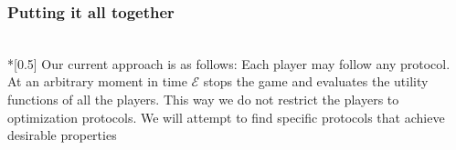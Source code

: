 \subsubsection{Putting it all together} \ \\*[0.5\baselineskip]
  Our current approach is as follows: Each player may follow any protocol. At an arbitrary
  moment in time $\mathcal{E}$ stops the game and evaluates the utility functions of all
  the players. This way we do not restrict the players to optimization protocols. We will
  attempt to find specific protocols that achieve desirable properties 
